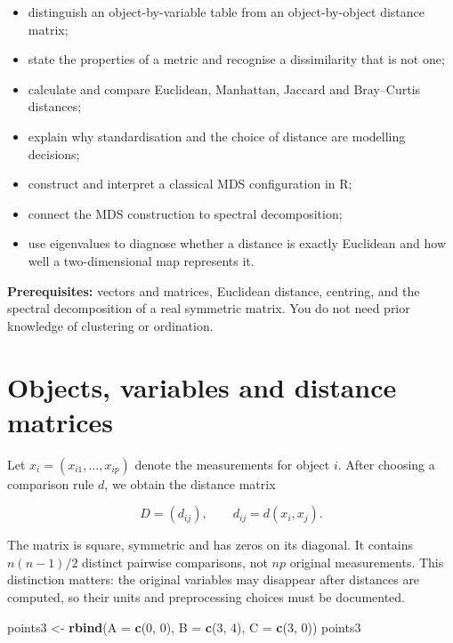\documentclass[
  english,
]{article}
\newenvironment{Shaded}{\begin{snugshade}}{\end{snugshade}}
\newcommand{\AttributeTok}[1]{\textcolor[rgb]{0.13,0.29,0.53}{#1}}
\newcommand{\DecValTok}[1]{\textcolor[rgb]{0.00,0.00,0.81}{#1}}
\newcommand{\FunctionTok}[1]{\textcolor[rgb]{0.13,0.29,0.53}{\textbf{#1}}}
\newcommand{\NormalTok}[1]{#1}
\newcommand{\OtherTok}[1]{\textcolor[rgb]{0.56,0.35,0.01}{#1}}
\providecommand{\tightlist}{%
  \setlength{\itemsep}{0pt}\setlength{\parskip}{0pt}}
\begin{document}
\begin{itemize}
\tightlist
\item
  distinguish an object-by-variable table from an object-by-object
  distance matrix;
\item
  state the properties of a metric and recognise a dissimilarity that is
  not one;
\item
  calculate and compare Euclidean, Manhattan, Jaccard and Bray--Curtis
  distances;
\item
  explain why standardisation and the choice of distance are modelling
  decisions;
\item
  construct and interpret a classical MDS configuration in R;
\item
  connect the MDS construction to spectral decomposition;
\item
  use eigenvalues to diagnose whether a distance is exactly Euclidean
  and how well a two-dimensional map represents it.
\end{itemize}

\textbf{Prerequisites:} vectors and matrices, Euclidean distance,
centring, and the spectral decomposition of a real symmetric matrix. You
do not need prior knowledge of clustering or ordination.

\section{Objects, variables and distance
matrices}\label{objects-variables-and-distance-matrices}

Let \(x_i=(x_{i1},\ldots,x_{ip})\) denote the measurements for object
\(i\). After choosing a comparison rule \(d\), we obtain the distance
matrix

\[D=(d_{ij}),\qquad d_{ij}=d(x_i,x_j).\]

The matrix is square, symmetric and has zeros on its diagonal. It
contains \(n(n-1)/2\) distinct pairwise comparisons, not \(np\) original
measurements. This distinction matters: the original variables may
disappear after distances are computed, so their units and preprocessing
choices must be documented.

\begin{Shaded}
\begin{Highlighting}[]
\NormalTok{points3 }\OtherTok{\textless{}{-}} \FunctionTok{rbind}\NormalTok{(}\AttributeTok{A =} \FunctionTok{c}\NormalTok{(}\DecValTok{0}\NormalTok{, }\DecValTok{0}\NormalTok{), }\AttributeTok{B =} \FunctionTok{c}\NormalTok{(}\DecValTok{3}\NormalTok{, }\DecValTok{4}\NormalTok{), }\AttributeTok{C =} \FunctionTok{c}\NormalTok{(}\DecValTok{3}\NormalTok{, }\DecValTok{0}\NormalTok{))}
\NormalTok{points3}
\end{Highlighting}
\end{Shaded}
\end{document}
